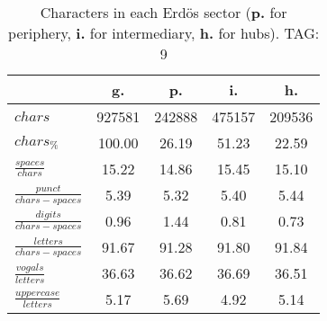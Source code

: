 \begin{table}[h!]
\begin{center}
\begin{tabular}{| l | c | c | c | c |}\hline
 & g. & p. & i. & h. \\\hline
$chars$ & 927581  & 242888  & 475157  & 209536 \\\hline
$chars_{\%}$ & 100.00  & 26.19  & 51.23  & 22.59 \\\hline
$\frac{spaces}{chars}$ & 15.22  & 14.86  & 15.45  & 15.10 \\\hline
$\frac{punct}{chars-spaces}$ & 5.39  & 5.32  & 5.40  & 5.44 \\\hline
$\frac{digits}{chars-spaces}$ & 0.96  & 1.44  & 0.81  & 0.73 \\\hline
$\frac{letters}{chars-spaces}$ & 91.67  & 91.28  & 91.80  & 91.84 \\\hline
$\frac{vogals}{letters}$ & 36.63  & 36.62  & 36.69  & 36.51 \\\hline
$\frac{uppercase}{letters}$ & 5.17  & 5.69  & 4.92  & 5.14 \\\hline
\end{tabular}
\caption{Characters in each Erd\"os sector ({{\bf p.}} for periphery, {{\bf i.}} for intermediary, 
    {{\bf h.}} for hubs). TAG: 9}
\end{center}
\end{table}